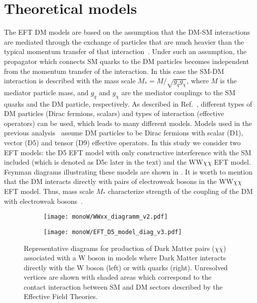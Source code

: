 \section{Theoretical models}

The EFT DM models are based on the assumption that 
the DM-SM interactions are mediated through the exchange of particles that are much heavier than the typical momentum transfer of that interaction~\cite{arXiv:1512.00476}.
Under such an assumption, the propagator which connects SM quarks to the DM particles becomes independent from the momentum transfer of the interaction. In this case the SM-DM interaction is described with the mass scale $M_{*} = M/\sqrt{g_q g_{\chi}}$, where $M$ is the mediator particle mass, and $g_q$ and $g_{\chi}$ are the mediator couplings to the SM quarks and the DM particle, respectively. As described in Ref.~\cite{dm_eft_models}, different types of DM particles (Dirac fermions, scalars) and types of interaction (effective operators) can be used, which leads to many different models.
Models used in the previous analysis~\cite{wprime_8TeV} assume DM particles to be Dirac fermions with scalar (D1), vector (D5) and tensor (D9) effective operators.
In this study we consider two EFT models: the D5 EFT model with only constructive interference with the SM included (which is denoted as D5c later in the text) and the WW$\chi\chi$ EFT model.
Feynman diagrams illustrating these models are shown in .
It is worth to mention that the DM interacts directly with pairs of electroweak bosons in the WW$\chi\chi$ EFT model. Thus, mass scale $M_{*}$ characterize strength of the coupling of the DM with electroweak bosons~\cite{EFT_WWxx_description}.

\begin{figure}[]

\centering
\begin{subfigure}{.5\textwidth}
  \centering
  \texttt{[image: monoW/WWxx\_diagramm\_v2.pdf]}
\end{subfigure}%
\begin{subfigure}{.5\textwidth}
  \centering
  \texttt{[image: monoW/EFT\_D5\_model\_diag\_v3.pdf]}
\end{subfigure}
  \caption{Representative diagrams for production of Dark Matter pairs ($\chi\overline{\chi}$) associated with a W boson in models where
Dark Matter interacts directly with the W boson (left) or with quarks (right).
Unresolved vertices are shown with shaded areas which correspond to the 
contact interaction between SM and DM sectors described by the Effective Field Theories.
}
  \label{fig:feynMonoWEFT}
\end{figure}

